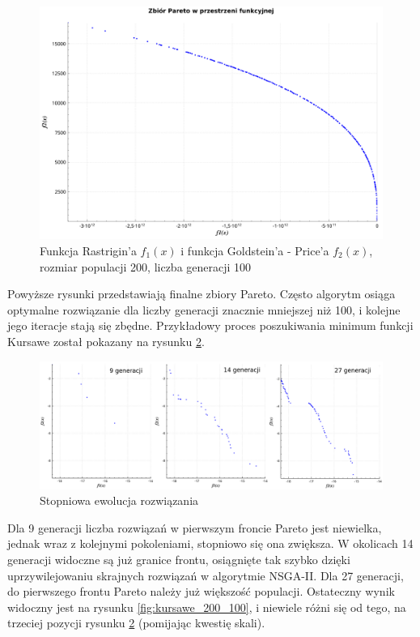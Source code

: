 \documentclass[11pt,a4paper]{article}
\begin{document}
\begin{figure}[H]
\centering
\includegraphics[width=14cm]{rastrigin_goldstein_200_100}
\caption{Funkcja Rastrigin'a \(f_1(x)\) i funkcja Goldstein'a - Price'a \(f_2(x)\), rozmiar populacji 200, liczba generacji 100}
\label{fig:rastrigin_goldstein_200_100}
\end{figure}

Powyższe rysunki przedstawiają finalne zbiory Pareto. Często algorytm osiąga optymalne rozwiązanie dla liczby generacji znacznie mniejszej niż 100, i kolejne jego iteracje stają się zbędne. Przykładowy proces poszukiwania minimum funkcji Kursawe został pokazany na rysunku \ref{fig:generacje}. 

\begin{figure}[H]
\begin{adjustwidth}{-4cm}{-4cm}
\centering
\includegraphics[width=18cm]{generacje}
\end{adjustwidth}
\caption{Stopniowa ewolucja rozwiązania}
\label{fig:generacje}
\end{figure}

Dla 9 generacji liczba rozwiązań w pierwszym froncie Pareto jest niewielka, jednak wraz z kolejnymi pokoleniami, stopniowo się ona zwiększa. W okolicach 14 generacji widoczne są już granice frontu, osiągnięte tak szybko dzięki uprzywilejowaniu skrajnych rozwiązań w algorytmie NSGA-II. Dla 27  generacji, do pierwszego frontu Pareto należy już większość populacji. Ostateczny wynik widoczny jest na rysunku \ref{fig:kursawe_200_100}, i niewiele różni się od tego, na trzeciej pozycji rysunku \ref{fig:generacje} (pomijając kwestię skali). 
\end{document}

